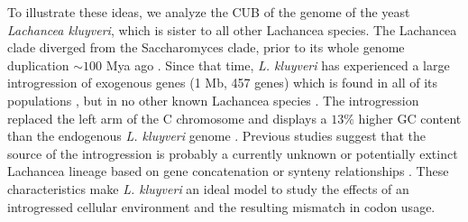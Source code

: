 \documentclass[doublespacing,linenumbers]{bmcart}
\newcommand{\kluyveri}{\textit{L. kluyveri}\xspace}
\newcommand{\GC}{GC content\xspace}
\begin{document}
To illustrate these ideas, we analyze the CUB of the genome of the yeast \emph{Lachancea kluyveri}, which is sister to all other Lachancea species.
The Lachancea clade diverged from the Saccharomyces clade, prior to its whole genome duplication $\sim 100$ Mya ago \citep{MHM2015,Beimforde2014}.
Since that time, \kluyveri has experienced a large introgression of exogenous genes (1 Mb, 457 genes) which is found in all of its populations \citep{payen2009,friedrich2015}, but in no other known Lachancea species \citep{vakirlis2016}.
The introgression replaced the left arm of the C chromosome and displays a $13 \%$ higher \GC than the endogenous \kluyveri genome \citep{payen2009, friedrich2015}.
Previous studies suggest that the source of the introgression is probably a currently unknown or potentially extinct Lachancea lineage based on gene concatenation or synteny relationships \citep{payen2009, friedrich2015, vakirlis2016, brion2017}.
These characteristics make \kluyveri an ideal model to study the effects of an introgressed cellular environment and the resulting mismatch in codon usage.
\end{document}
